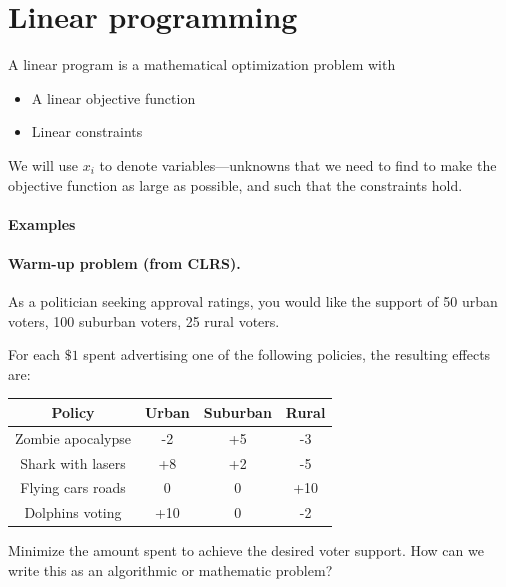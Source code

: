 \documentclass[11  pt]{article}
\begin{document}
	
		\section{Linear programming}
		
		A linear program is a mathematical optimization problem with 
	\begin{itemize}
		\item A linear objective function
		\item Linear constraints
	\end{itemize}

We will use $x_i$ to denote variables---unknowns that we need to find to make the objective function as large as possible, and such that the constraints hold. \\

\paragraph{Examples} 

\newpage

		
		\paragraph{Warm-up problem (from CLRS).} 
As a politician seeking approval ratings, you would like the
support of 50 urban voters, 100 suburban voters, 25 rural
voters. 
		
For each $\$1$ spent advertising one of the following policies,
the resulting effects are:
		
\begin{center}
\begin{tabular}{|c|c|c|c|}
\hline
\textbf{Policy} & \textbf{Urban} & \textbf{Suburban} & \textbf{Rural} \\
\hline
Zombie apocalypse & -2 & +5 & -3 \\
Shark with lasers & +8 & +2 & -5 \\
Flying cars roads & 0 & 0 & +10 \\
Dolphins voting & +10 & 0 & -2 \\
\hline
\end{tabular}
\end{center}		

Minimize the amount spent to achieve the desired voter support. 
How can we write this as an algorithmic or mathematic problem?		
\end{document}
